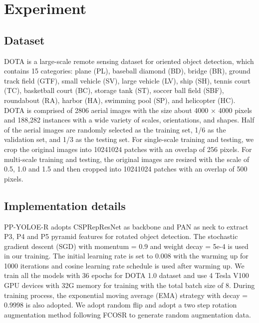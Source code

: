 \documentclass[final]{cvpr}
\begin{document}
\section{Experiment}

\subsection{Dataset}
DOTA\cite{xia2018dota} is a large-scale remote sensing dataset for oriented object detection, which contains 15 categories: plane (PL), baseball diamond (BD), bridge (BR), ground track field (GTF), small vehicle (SV), large vehicle (LV), ship (SH), tennis court (TC), basketball court (BC), storage tank (ST), soccer ball field (SBF), roundabout (RA), harbor (HA), swimming pool (SP), and helicopter (HC). DOTA is comprised of 2806 aerial images with the size about 4000 × 4000 pixels and 188,282 instances with a wide variety of scales, orientations, and shapes. Half of the aerial images are randomly selected as the training set, 1/6 as the validation set, and 1/3 as the testing set. For single-scale training and testing, we crop the original images into 10241024 patches with an overlap of 256 pixels. For multi-scale training and testing, the original images are resized with the scale of 0.5, 1.0 and 1.5 and then cropped into 10241024 patches with an overlap of 500 pixels.
\subsection{Implementation details}
PP-YOLOE-R adopts CSPRepResNet as backbone and PAN as neck to extract P3, P4 and P5 pyramid features for rotated object detection. The stochastic gradient descent (SGD) with momentum = 0.9 and weight decay = 5e-4 is used in our training. The initial learning rate is set to 0.008 with the warming up for 1000 iterations and cosine learning rate schedule is used after warming up. We train all the models with 36 epochs for DOTA 1.0 dataset and use 4 Tesla V100 GPU devices with 32G memory for training with the total batch size of 8. During training process, the exponential moving average (EMA) strategy with decay = 0.9998 is also adopted. We adopt random flip and adopt a two step rotation augmentation method following FCOSR\cite{li2021fcosr} to generate random augmentation data.
\end{document}
